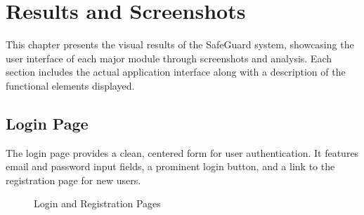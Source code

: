 \chapter{Results and Screenshots}

This chapter presents the visual results of the SafeGuard system, showcasing the user interface of each major module through screenshots and analysis. Each section includes the actual application interface along with a description of the functional elements displayed.

\section{Login Page}

The login page provides a clean, centered form for user authentication. It features email and password input fields, a prominent login button, and a link to the registration page for new users.

\begin{figure}[H]
  \centering
  \begin{minipage}{0.45\textwidth}
    \centering
  \end{minipage}
  \hfill
  \begin{minipage}{0.45\textwidth}
    \centering
  \end{minipage}
  \caption{Login and Registration Pages}
  \label{fig:screenshots-auth}
\end{figure}

